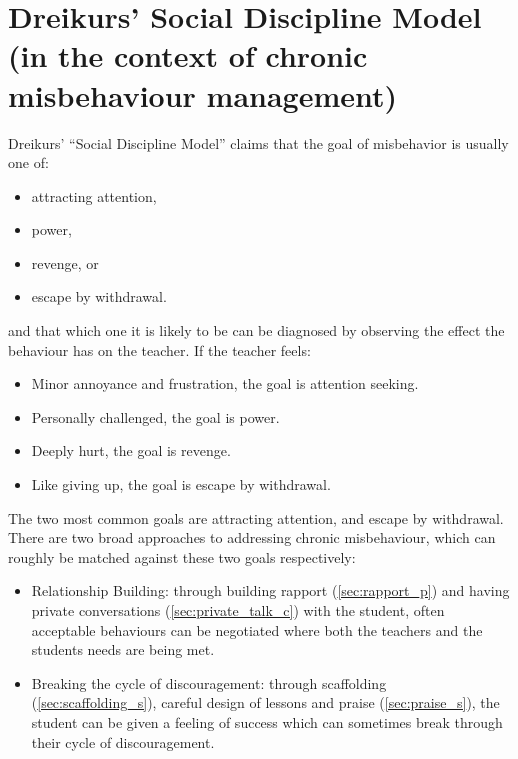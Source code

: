 \documentclass[12pt]{report}
\begin{document}
\section{Dreikurs' Social Discipline Model (in the context of chronic misbehaviour management)}
\label{sec:dreikur_theory}

Dreikurs' ``Social Discipline Model'' claims that the goal of misbehavior is usually one of:
\begin{itemize}
  \item attracting attention,
  \item power,
  \item revenge, or
  \item escape by withdrawal.
\end{itemize}
and that which one it is likely to be can be diagnosed by observing the effect the behaviour has on the teacher. If the teacher feels:
\begin{itemize}
  \item Minor annoyance and frustration, the goal is attention seeking.
  \item Personally challenged, the goal is power. 
  \item Deeply hurt, the goal is revenge.
  \item Like giving up, the goal is escape by withdrawal.
\end{itemize}
The two most common goals are attracting attention, and escape by withdrawal. There are two broad approaches to addressing chronic misbehaviour, which can roughly be matched against these two goals respectively:
\begin{itemize}
  \item Relationship Building: through building rapport (\ref{sec:rapport_p}) and having private conversations (\ref{sec:private_talk_c}) with the student, often acceptable behaviours can be negotiated where both the teachers and the students needs are being met.
  \item Breaking the cycle of discouragement: through scaffolding (\ref{sec:scaffolding_s}), careful design of lessons and praise (\ref{sec:praise_s}), the student can be given a feeling of success which can sometimes break through their cycle of discouragement.
\end{itemize}
  
\end{document}
